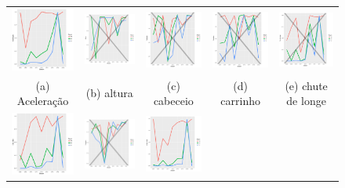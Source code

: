\documentclass[doc,apacite,oneside,a4paper,12pt]{apa6}
\begin{document}
\begin{figure}
\begin{tabular}{ccccc}
  \includegraphics[width=25mm]{aceleracao_result_trans_media} & \includegraphics[width=25mm]{altura_result_trans_media} & \includegraphics[width=25mm]{cabeceio_result_trans_media} &   \includegraphics[width=25mm]{carrinho_result_trans_media} &
  \includegraphics[width=25mm]{ch_delonge_result_trans_media} \\
\scriptsize{(a) Aceleração } & \scriptsize{(b) altura  } & \scriptsize{(c) cabeceio } & \scriptsize{(d) carrinho } & \scriptsize{(e) chute de longe }\\[3pt]
\includegraphics[width=25mm]{cobr_falta_result_trans_media} & \includegraphics[width=25mm]{combativ__result_trans_media} &   \includegraphics[width=25mm]{contr_bola_result_trans_media} &

\end{tabular}
\end{figure}
\end{document}

